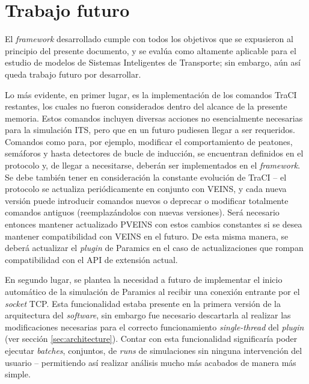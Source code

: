 \section{Trabajo futuro}

El \emph{framework} desarrollado cumple con todos los objetivos que se expusieron al principio del presente documento, y se evalúa como altamente aplicable para el estudio de modelos de Sistemas Inteligentes de Transporte; sin embargo, aún así queda trabajo futuro por desarrollar. 

Lo más evidente, en primer lugar, es la implementación de los comandos TraCI restantes, los cuales no fueron considerados dentro del alcance de la presente memoria. Estos comandos incluyen diversas acciones no esencialmente necesarias para la simulación ITS, pero que en un futuro pudiesen llegar a ser requeridos. Comandos como para, por ejemplo, modificar el comportamiento de peatones, semáforos y hasta detectores de bucle de inducción, se encuentran definidos en el protocolo y, de llegar a necesitarse, deberán ser implementados en el \emph{framework}. 
Se debe también tener en consideración la constante evolución de TraCI -- el protocolo se actualiza periódicamente en conjunto con VEINS, y cada nueva versión puede introducir comandos nuevos o deprecar o modificar totalmente comandos antiguos (reemplazándolos con nuevas versiones). Será necesario entonces mantener actualizado PVEINS con estos cambios constantes si se desea mantener compatibilidad con VEINS en el futuro. 
De esta misma manera, se deberá actualizar el \emph{plugin} de Paramics en el caso de actualizaciones que rompan compatibilidad con el API de extensión actual.

En segundo lugar, se plantea la necesidad a futuro de implementar el inicio automático de la simulación de Paramics al recibir una conexión entrante por el \emph{socket} TCP. Esta funcionalidad estaba presente en la primera versión de la arquitectura del \emph{software}, sin embargo fue necesario descartarla al realizar las modificaciones necesarias para el correcto funcionamiento \emph{single-thread} del \emph{plugin} (ver sección \ref{sec:architecture}). Contar con esta funcionalidad significaría poder ejecutar \emph{batches}, conjuntos, de \emph{runs} de simulaciones sin ninguna intervención del usuario -- permitiendo así realizar análisis mucho más acabados de manera más simple.

